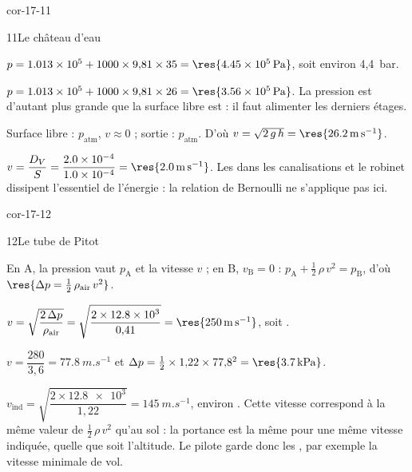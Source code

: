 \begin{blocLivre}{cor-17-11}
\begin{corrige}{11}{Le château d'eau}
\begin{questions}
\item $p=\num{1.013e5}+1000\times9{,}81\times35=\res{\qty{4,45e5}{Pa}}$, soit environ 4,4~bar.
\item $p=\num{1.013e5}+1000\times9{,}81\times26=\res{\qty{3,56e5}{Pa}}$. La pression est d'autant plus grande que la surface
libre est  : il faut alimenter les derniers étages.
\item Surface libre : $p_\mathrm{atm}$, $v\approx0$ ; sortie : $p_\mathrm{atm}$. D'où $v=\sqrt{2\,g\,h}=\res{\qty{26,2}{m.s^{-1}}}$.
\item $v=\dfrac{D_V}{S}=\dfrac{\num{2.0e-4}}{\num{1.0e-4}}=\res{\qty{2,0}{m.s^{-1}}}$. Les  dans les
canalisations et le robinet dissipent l'essentiel de l'énergie : la relation de Bernoulli ne s'applique pas ici.
\end{questions}
\end{corrige}
\end{blocLivre}
\begin{blocLivre}{cor-17-12}
\begin{corrige}{12}{Le tube de Pitot}
\begin{questions}
\item En A, la pression vaut $p_\mathrm{A}$ et la vitesse $v$ ; en B, $v_\mathrm{B}=0$ : $p_\mathrm{A}+\frac12\,\rho\,v^2=p_\mathrm{B}$, d'où
$\res{\Delta p=\frac12\,\rho_\mathrm{air}\,v^2}$.
\item $v=\sqrt{\dfrac{2\,\Delta p}{\rho_\mathrm{air}}}=\sqrt{\dfrac{2\times\num{12.8e3}}{0{,}41}}=\res{\qty{250}{m.s^{-1}}}$, soit
.
\item $v=\dfrac{280}{3{,}6}=\qty{77,8}{m.s^{-1}}$ et $\Delta p=\frac12\times1{,}22\times77{,}8^2=\res{\qty{3,7}{kPa}}$.
\item $v_\mathrm{ind}=\sqrt{\dfrac{2\times\num{12.8e3}}{1{,}22}}=\qty{145}{m.s^{-1}}$, environ . Cette vitesse
correspond à la même valeur de $\frac12\,\rho\,v^2$ qu'au sol : la portance est la même pour une même vitesse
indiquée, quelle que soit l'altitude. Le pilote garde donc les , par exemple la vitesse
minimale de vol.
\end{questions}
\end{corrige}
\end{blocLivre}
